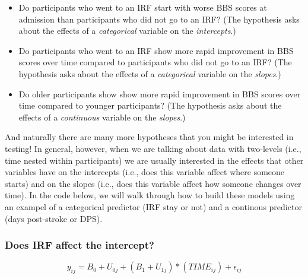 \documentclass[]{article}
\providecommand{\tightlist}{%
  \setlength{\itemsep}{0pt}\setlength{\parskip}{0pt}}
\begin{document}
\begin{itemize}
\tightlist
\item
  Do participants who went to an IRF start with worse BBS scores at
  admission than participants who did not go to an IRF? (The hypothesis
  asks about the effects of a \emph{categorical} variable on the
  \emph{intercepts}.)
\item
  Do participants who went to an IRF show more rapid improvement in BBS
  scores over time compared to participants who did not go to an IRF?
  (The hypothesis asks about the effects of a \emph{categorical}
  variable on the \emph{slopes}.)
\item
  Do older participants show show more rapid improvement in BBS scores
  over time compared to younger participants? (The hypothesis asks about
  the effects of a \emph{continuous} variable on the \emph{slopes}.)
\end{itemize}

And naturally there are many more hypotheses that you might be
interested in testing! In general, however, when we are talking about
data with two-levels (i.e., time nested within participants) we are
usually interested in the effects that other variables have on the
intercepts (i.e., does this variable affect where someone starts) and on
the slopes (i.e., does this variable affect how someone changes over
time). In the code below, we will walk through how to build these models
using an exampel of a categorical predictor (IRF stay or not) and a
continous predictor (days post-stroke or DPS).

\subsubsection{Does IRF affect the
intercept?}\label{does-irf-affect-the-intercept}

\[y_{ij} = B_0 + U_{0j} + (B_1+ U_{1j})*(TIME_{ij}) + \epsilon_{ij}\]
\end{document}
